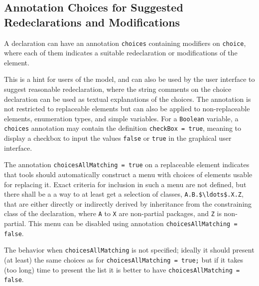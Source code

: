 \subsection{Annotation Choices for Suggested Redeclarations and Modifications}\label{annotation-choices-for-suggested-redeclarations-and-modifications}

A declaration can have an annotation \lstinline!choices! containing modifiers on
\lstinline!choice!, where each of them indicates a suitable redeclaration or
modifications of the element.

This is a hint for users of the model, and can also be used by the user interface to suggest reasonable redeclaration, where the string comments on the choice declaration can be used as textual explanations of the choices. The annotation is not restricted to replaceable elements but can also be applied to non-replaceable elements, enumeration types, and simple variables.  For a \lstinline!Boolean! variable, a \lstinline!choices! annotation may contain the definition \lstinline!checkBox = true!, meaning to display a checkbox to input the values \lstinline!false! or \lstinline!true! in the graphical user interface.

The annotation \lstinline!choicesAllMatching = true! on a replaceable element indicates that tools
should automatically construct a menu with choices of elements usable for replacing it.
Exact criteria for inclusion in such a menu are not defined,
but there shall be a a way to at least get a selection of classes, \lstinline!A.B.$\ldots$.X.Z!,
that are either directly or indirectly derived by inheritance from the constraining class of the declaration,
where \lstinline!A! to \lstinline!X! are non-partial packages, and \lstinline!Z! is non-partial.
This menu can be disabled using annotation \lstinline!choicesAllMatching = false!.
\begin{nonnormative}
The behavior when \lstinline!choicesAllMatching! is not specified; ideally it should present (at least) the same choices as for \lstinline!choicesAllMatching = true;! but if it takes (too long) time to present the list it is better to have \lstinline!choicesAllMatching = false!.
\end{nonnormative}

